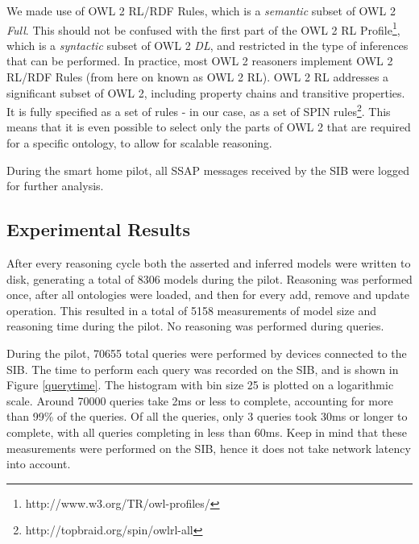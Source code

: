 
We made use of OWL 2 RL/RDF Rules, which is a \emph{semantic} subset of OWL 2 \emph{Full}. This should not be confused with the first part of the OWL 2 RL Profile\footnote{http://www.w3.org/TR/owl-profiles/}, which is a \emph{syntactic} subset of OWL 2 \emph{DL}, and restricted in the type of inferences that can be performed. In practice, most OWL 2 reasoners implement OWL 2 RL/RDF Rules (from here on known as OWL 2 RL). OWL 2 RL addresses a significant subset of OWL 2, including property chains and transitive properties. It is fully specified as a set of rules - in our case, as a set of SPIN rules\footnote{ http://topbraid.org/spin/owlrl-all}. This means that it is even possible to select only the parts of OWL 2 that are required for a specific ontology, to allow for scalable reasoning.

During the smart home pilot, all SSAP messages received by the SIB were logged for further analysis.

\subsection{Experimental Results}
\label{results}

After every reasoning cycle both the asserted and inferred models were written to disk, generating a total of 8306 models during the pilot. Reasoning was performed once, after all ontologies were loaded, and then for every add, remove and update operation. This resulted in a total of 5158 measurements of model size and reasoning time during the pilot. No reasoning was performed during queries.

During the pilot, 70655 total queries were performed by devices connected to the SIB. The time to perform each query was recorded on the SIB, and is shown in Figure \ref{querytime}. The histogram with bin size 25 is plotted on a logarithmic scale. Around 70000 queries take 2ms or less to complete, accounting for more than 99\% of the queries. Of all the queries, only 3 queries took 30ms or longer to complete, with all queries completing in less than 60ms. Keep in mind that these measurements were performed on the SIB, hence it does not take network latency into account.

